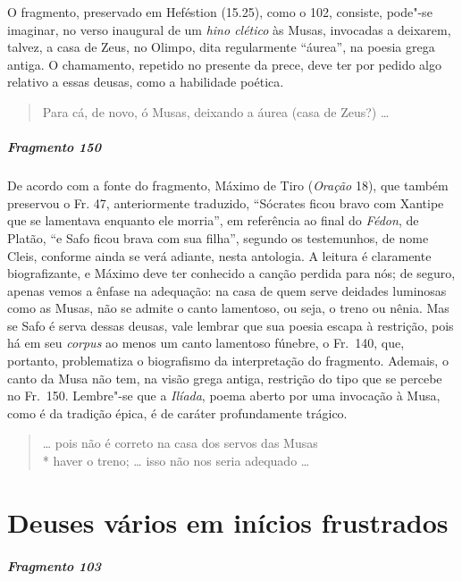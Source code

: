 {\small O fragmento, preservado em Heféstion (15.25), como o 102, consiste, pode"-se imaginar, no
verso inaugural de um \textit{hino clético }às Musas, invocadas a deixarem,
talvez, a casa de Zeus, no Olimpo, dita regularmente ``áurea”,
na poesia grega antiga. O chamamento, repetido no presente da prece, deve ter
por pedido algo relativo a essas deusas, como a habilidade poética.}

\begin{verse}
Para cá, de novo, ó Musas, deixando a áurea \qb{}(casa de Zeus?) \ldots{}
\end{verse}

\paragraph{Fragmento 150}

{\small De acordo com a fonte do fragmento, Máximo de Tiro (\textit{Oração} 18), que também preservou o Fr.
47, anteriormente traduzido, ``Sócrates ficou bravo com Xantipe que se
lamentava enquanto ele morria”, em referência ao final do \textit{Fédon}, de
Platão, ``e Safo ficou brava com sua filha”, segundo os testemunhos, de
nome Cleis, conforme ainda se verá adiante, nesta antologia. A leitura é
claramente biografizante, e Máximo deve ter conhecido a canção perdida para
nós; de seguro, apenas vemos a ênfase na adequação: na casa de quem serve
deidades luminosas como as Musas, não se admite o canto lamentoso, ou seja, o
treno ou nênia. Mas se Safo é serva dessas deusas, vale lembrar que sua poesia
escapa à restrição, pois há em seu \textit{corpus} ao menos um canto lamentoso
fúnebre, o Fr.~140, que, portanto, problematiza o biografismo da interpretação
do fragmento. Ademais, o canto da Musa não tem, na visão grega antiga,
restrição do tipo que se percebe no Fr.~150. Lembre"-se que a \textit{Ilíada},
poema aberto por uma invocação à Musa, como é da tradição épica, é de caráter
profundamente trágico.}

\begin{verse}
\ldots{} pois não é correto na casa dos servos das \qb{}Musas\\*
haver o treno; \ldots{} isso não nos seria \qb{}adequado \ldots{}
\end{verse}

\chapter{Deuses vários em inícios frustrados}

\paragraph{Fragmento 103}


